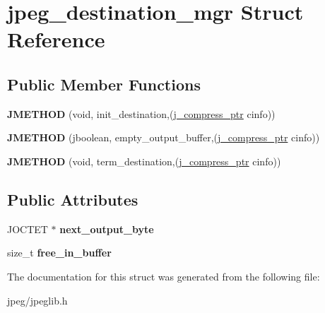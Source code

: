 \hypertarget{structjpeg__destination__mgr}{}\section{jpeg\+\_\+destination\+\_\+mgr Struct Reference}
\label{structjpeg__destination__mgr}
\subsection*{Public Member Functions}
\begin{DoxyCompactItemize}
\item 
{\bfseries J\+M\+E\+T\+H\+OD} (void, init\+\_\+destination,(\hyperlink{structjpeg__compress__struct}{j\+\_\+compress\+\_\+ptr} cinfo))\hypertarget{structjpeg__destination__mgr_ae29d14eb632140c7c67eda8c5824383c}{}\label{structjpeg__destination__mgr_ae29d14eb632140c7c67eda8c5824383c}

\item 
{\bfseries J\+M\+E\+T\+H\+OD} (jboolean, empty\+\_\+output\+\_\+buffer,(\hyperlink{structjpeg__compress__struct}{j\+\_\+compress\+\_\+ptr} cinfo))\hypertarget{structjpeg__destination__mgr_a3ebd0fa6da36713ace27ff79711b9e46}{}\label{structjpeg__destination__mgr_a3ebd0fa6da36713ace27ff79711b9e46}

\item 
{\bfseries J\+M\+E\+T\+H\+OD} (void, term\+\_\+destination,(\hyperlink{structjpeg__compress__struct}{j\+\_\+compress\+\_\+ptr} cinfo))\hypertarget{structjpeg__destination__mgr_a1158df5e49ecfa2a7d0905eef216afbf}{}\label{structjpeg__destination__mgr_a1158df5e49ecfa2a7d0905eef216afbf}

\end{DoxyCompactItemize}
\subsection*{Public Attributes}
\begin{DoxyCompactItemize}
\item 
J\+O\+C\+T\+ET $\ast$ {\bfseries next\+\_\+output\+\_\+byte}\hypertarget{structjpeg__destination__mgr_a3dac0ab8cc4daeb1efb9fea2e07449c0}{}\label{structjpeg__destination__mgr_a3dac0ab8cc4daeb1efb9fea2e07449c0}

\item 
size\+\_\+t {\bfseries free\+\_\+in\+\_\+buffer}\hypertarget{structjpeg__destination__mgr_a397cc63a089447fe96e35062c4979906}{}\label{structjpeg__destination__mgr_a397cc63a089447fe96e35062c4979906}

\end{DoxyCompactItemize}


The documentation for this struct was generated from the following file\+:\begin{DoxyCompactItemize}
\item 
jpeg/jpeglib.\+h\end{DoxyCompactItemize}
